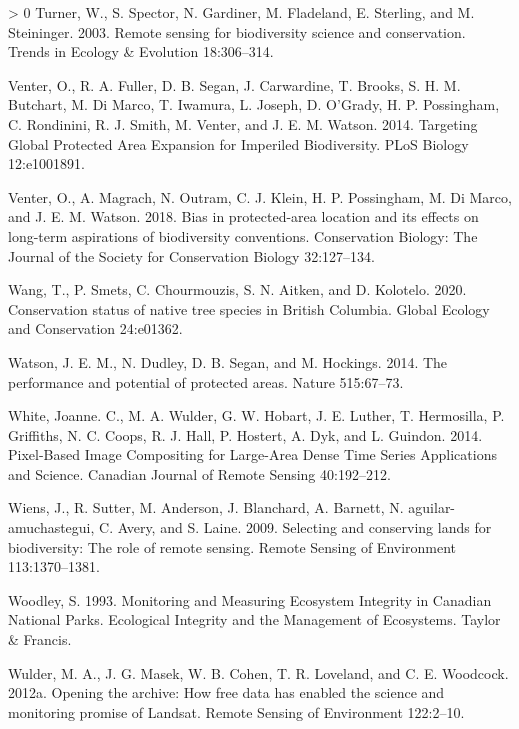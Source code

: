 \documentclass[10pt,oneside]{article}
\newlength{\cslhangindent}
\newenvironment{CSLReferences}[3] %
 {%
  \setlength{\parindent}{0pt}
  \ifodd #1 \everypar{\setlength{\hangindent}{\cslhangindent}}\ignorespaces\fi
  \ifnum #2 > 0
  \setlength{\parskip}{#2\baselineskip}
  \fi
 }%
 {}
\begin{document}
\begin{CSLReferences}{1}{0}
\leavevmode\hypertarget{ref-turner2003}{}%
Turner, W., S. Spector, N. Gardiner, M. Fladeland, E. Sterling, and M.
Steininger. 2003. Remote sensing for biodiversity science and
conservation. Trends in Ecology \& Evolution 18:306--314.

\leavevmode\hypertarget{ref-venter2014}{}%
Venter, O., R. A. Fuller, D. B. Segan, J. Carwardine, T. Brooks, S. H.
M. Butchart, M. Di Marco, T. Iwamura, L. Joseph, D. O'Grady, H. P.
Possingham, C. Rondinini, R. J. Smith, M. Venter, and J. E. M. Watson.
2014. Targeting Global Protected Area Expansion for Imperiled
Biodiversity. PLoS Biology 12:e1001891.

\leavevmode\hypertarget{ref-venter2018}{}%
Venter, O., A. Magrach, N. Outram, C. J. Klein, H. P. Possingham, M. Di
Marco, and J. E. M. Watson. 2018. Bias in protected-area location and
its effects on long-term aspirations of biodiversity conventions.
Conservation Biology: The Journal of the Society for Conservation
Biology 32:127--134.

\leavevmode\hypertarget{ref-wang2020}{}%
Wang, T., P. Smets, C. Chourmouzis, S. N. Aitken, and D. Kolotelo. 2020.
Conservation status of native tree species in British Columbia. Global
Ecology and Conservation 24:e01362.

\leavevmode\hypertarget{ref-watsonPerformancePotentialProtected2014}{}%
Watson, J. E. M., N. Dudley, D. B. Segan, and M. Hockings. 2014. The
performance and potential of protected areas. Nature 515:67--73.

\leavevmode\hypertarget{ref-whitePixelBasedImageCompositing2014}{}%
White, Joanne. C., M. A. Wulder, G. W. Hobart, J. E. Luther, T.
Hermosilla, P. Griffiths, N. C. Coops, R. J. Hall, P. Hostert, A. Dyk,
and L. Guindon. 2014. Pixel-Based Image Compositing for Large-Area Dense
Time Series Applications and Science. Canadian Journal of Remote Sensing
40:192--212.

\leavevmode\hypertarget{ref-wiens2009}{}%
Wiens, J., R. Sutter, M. Anderson, J. Blanchard, A. Barnett, N.
aguilar-amuchastegui, C. Avery, and S. Laine. 2009. Selecting and
conserving lands for biodiversity: The role of remote sensing. Remote
Sensing of Environment 113:1370--1381.

\leavevmode\hypertarget{ref-woodleyMonitoringMeasuringEcosystem1993}{}%
Woodley, S. 1993. Monitoring and Measuring Ecosystem Integrity in
Canadian National Parks. Ecological Integrity and the Management of
Ecosystems. Taylor \& Francis.

\leavevmode\hypertarget{ref-wulderOpeningArchiveHow2012}{}%
Wulder, M. A., J. G. Masek, W. B. Cohen, T. R. Loveland, and C. E.
Woodcock. 2012a. Opening the archive: How free data has enabled the
science and monitoring promise of Landsat. Remote Sensing of Environment
122:2--10.


\end{CSLReferences}
\end{document}
